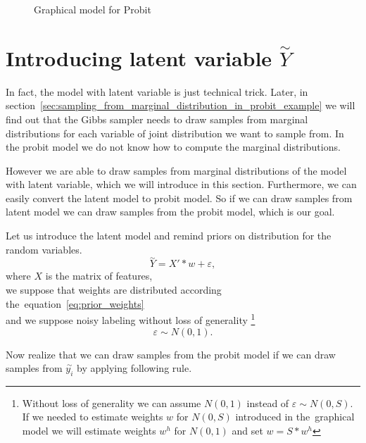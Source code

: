 \begin{figure}[!hb]
\centering

\caption{Graphical model for Probit}
\label{fig:probitGM}
\end{figure}

\section{Introducing latent variable $\overset{\sim}{Y}$ }
\label{sec:introducing_latent_variale}
In fact, the model with latent variable is just technical trick.
Later, in section~\ref{sec:sampling_from_marginal_distribution_in_probit_example} we will find out that the Gibbs sampler 
needs to draw samples from marginal distributions for each variable of joint distribution we want to sample from.
In the probit model we do not know how to compute the marginal distributions.

However we are able to draw samples from marginal distributions of the model with latent variable,
which we will introduce in this section.
Furthermore, we can easily convert the latent model to probit model.
So if we can draw samples from latent model we can draw samples from the probit model, which is our goal.

Let us introduce the latent model and remind priors on distribution for the random variables.
\begin{equation}\label{eq:lat}
    \overset{\sim}{Y} = X' * w + \varepsilon, 
\end{equation}
where $X$ is the matrix of features, \\
we suppose that weights are distributed according the~equation~\ref{eq:prior_weights} \\ 
and  we suppose noisy labeling without loss of generality 
\footnote{Without loss of generality we can assume $N(0,1)$ instead of $\varepsilon \sim N(0, S)$. 
    If we needed to estimate weights $w$ for $N(0, S)$ introduced in the~graphical model we will estimate weights $w^h$ for $N(0,1)$ and set $w = S*w^h$}
\begin{equation}\label{eq:noise}
\varepsilon \sim N(0, 1).
\end{equation}

Now realize that we can draw samples from the probit model if we can draw samples from $\overset{\sim}{y_{i}}$
by applying following rule.

